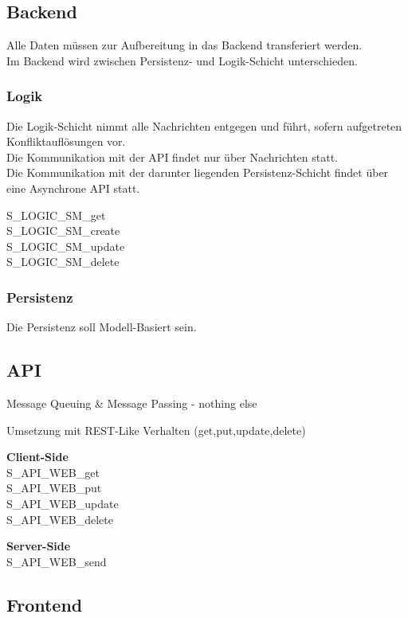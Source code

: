 \documentclass[oneside,11pt,parskip=half,ngerman]{scrreprt}
\begin{document}
\subsection{Backend}\label{backend}

Alle Daten müssen zur Aufbereitung in das Backend transferiert
werden.\\Im Backend wird zwischen Persistenz- und Logik-Schicht
unterschieden.

\subsubsection{Logik}\label{logik}

Die Logik-Schicht nimmt alle Nachrichten entgegen und führt, sofern
aufgetreten Konfliktauflösungen vor.\\Die Kommunikation mit der API
findet nur über Nachrichten statt.\\Die Kommunikation mit der darunter
liegenden Persistenz-Schicht findet über eine Asynchrone API statt.

S\_LOGIC\_SM\_get\\S\_LOGIC\_SM\_create\\S\_LOGIC\_SM\_update\\S\_LOGIC\_SM\_delete

\subsubsection{Persistenz}\label{persistenz}

Die Persistenz soll Modell-Basiert sein.

\subsection{API}\label{api}

Message Queuing \& Message Passing - nothing else

Umsetzung mit REST-Like Verhalten (get,put,update,delete)

\textbf{Client-Side}\\S\_API\_WEB\_get\\S\_API\_WEB\_put\\S\_API\_WEB\_update\\S\_API\_WEB\_delete

\textbf{Server-Side}\\S\_API\_WEB\_send

\subsection{Frontend}\label{frontend}
\end{document}

